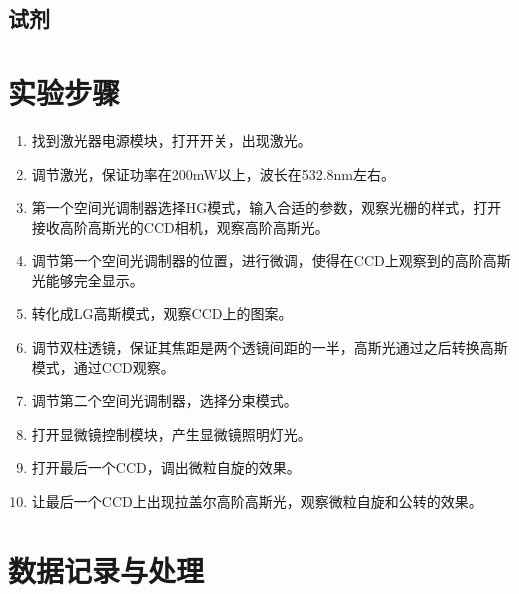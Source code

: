 \documentclass[UTF8,12pt,a4paper]{article}
\begin{document}
\subsection{试剂}

\section{实验步骤}
\begin{enumerate}
	\item 找到激光器电源模块，打开开关，出现激光。
	\item 调节激光，保证功率在200mW以上，波长在532.8nm左右。
	\item 第一个空间光调制器选择HG模式，输入合适的参数，观察光栅的样式，打开接收高阶高斯光的CCD相机，观察高阶高斯光。
	\item 调节第一个空间光调制器的位置，进行微调，使得在CCD上观察到的高阶高斯光能够完全显示。
	\item 转化成LG高斯模式，观察CCD上的图案。
	\item 调节双柱透镜，保证其焦距是两个透镜间距的一半，高斯光通过之后转换高斯模式，通过CCD观察。
	\item 调节第二个空间光调制器，选择分束模式。
	\item 打开显微镜控制模块，产生显微镜照明灯光。
	\item 打开最后一个CCD，调出微粒自旋的效果。
	\item 让最后一个CCD上出现拉盖尔高阶高斯光，观察微粒自旋和公转的效果。
\end{enumerate}


\section{数据记录与处理}
\end{document}
